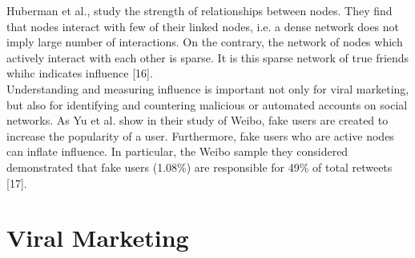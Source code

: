 \documentclass[conference,letterpaper]{IEEEtran}
\begin{document}
\indent
Huberman et al., study the strength of relationships between nodes. They find that nodes interact with few of their linked nodes, i.e. a dense network does not imply large number of interactions. On the contrary, the network of nodes which actively interact with each other is sparse. It is this sparse network of true friends whihc indicates influence [16].\\
Understanding and measuring influence is important not only for viral marketing, but also for identifying and countering malicious or automated accounts on social networks. As Yu et al. show in their study of Weibo, fake users are created to increase the popularity of a user. Furthermore, fake users who are active nodes can inflate influence. In particular,
the Weibo sample they considered demonstrated that fake users (1.08\%) are responsible for 49\% of total retweets [17]. 

\section{Viral Marketing}
\end{document}
